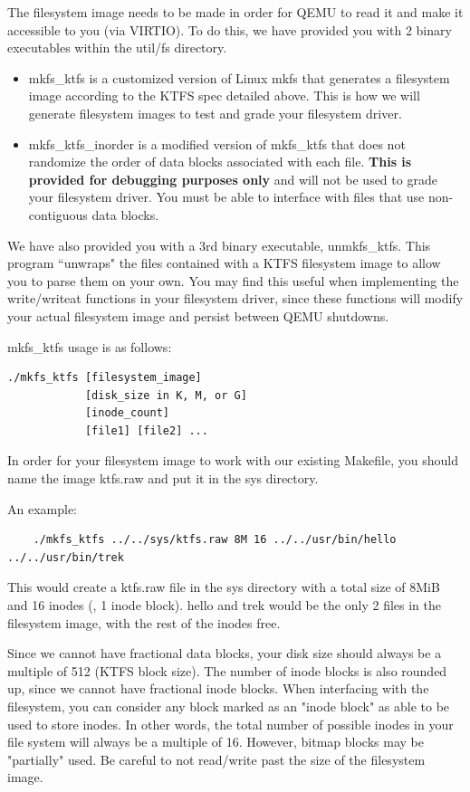 \documentclass{article}
\begin{document}

The filesystem image needs to be made
in order for QEMU to read it and make it accessible to you (via VIRTIO). To do this,
we have provided you with 2 binary executables within the {\fix util/fs} directory.

\begin{itemize}
	\item {\fix mkfs\_ktfs} is a customized version of Linux {\fix mkfs} that generates a filesystem
	image according to the KTFS spec detailed above. This is how we will generate filesystem images to
	test and grade your filesystem driver.
	\item {\fix mkfs\_ktfs\_inorder} is a modified version of {\fix mkfs\_ktfs} that does not randomize the
	order of data blocks associated with each file. \textbf{This is provided for debugging purposes only} and
	will not be used to grade your filesystem driver. You must be able to interface with files that use non-contiguous data
	blocks.
\end{itemize}

We have also provided you with a 3rd binary executable, {\fix unmkfs\_ktfs}. This program ``unwraps" the
files contained with a KTFS filesystem image to allow you to parse them on your own. You may find this useful when
implementing the write/writeat functions in your filesystem driver, since these functions will modify your actual
filesystem image and persist between QEMU shutdowns.

{\fix mkfs\_ktfs} usage is as follows:
\begin{verbatim}
./mkfs_ktfs [filesystem_image] 
            [disk_size in K, M, or G] 
            [inode_count] 
            [file1] [file2] ...
\end{verbatim}
In order for your filesystem image to work with our existing {\fix Makefile}, you should name
the image {\fix ktfs.raw} and put it in the {\fix sys} directory. 

An example:
\begin{verbatim}
	./mkfs_ktfs ../../sys/ktfs.raw 8M 16 ../../usr/bin/hello ../../usr/bin/trek
\end{verbatim}

This would create a {\fix ktfs.raw} file in the {\fix sys} directory with a total size of 8MiB and 16 inodes (\ie, 1 inode block).
{\fix hello} and {\fix trek} would be the only 2 files in the filesystem image, with the rest of the inodes free.

Since we cannot have fractional data blocks, your disk size should always be a multiple of 512 (KTFS block size).
The number of inode blocks is also rounded up, since we cannot have fractional inode blocks. When interfacing with the filesystem, you can
consider any block marked as an "inode block" as able to be used to store inodes. In other words, the total number of possible inodes in your
file system will always be a multiple of 16.
However, bitmap blocks may be "partially" used. Be careful to not read/write past the size of the filesystem image.
\end{document}
